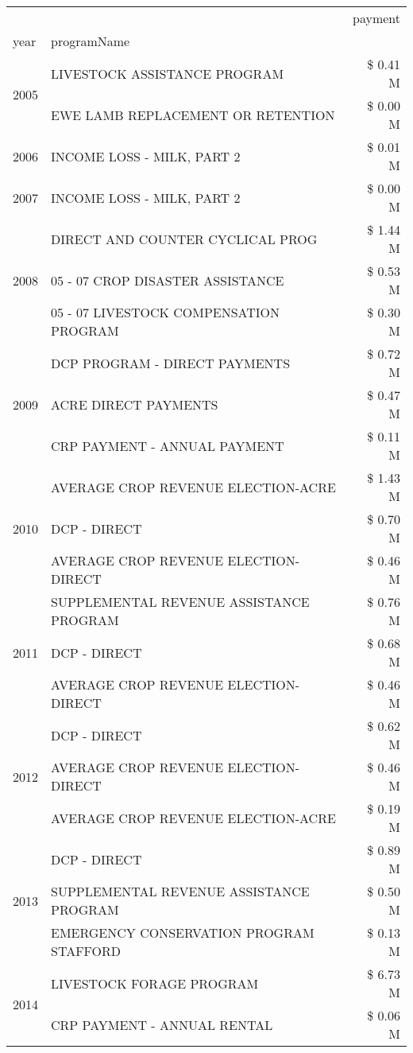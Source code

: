 \begin{tabular}{llr}
\toprule
 &  & payment \\
year & programName &  \\
\midrule
\multirow[t]{2}{*}{2005} & LIVESTOCK ASSISTANCE PROGRAM & \$ 0.41 M \\
 & EWE LAMB REPLACEMENT OR RETENTION & \$ 0.00 M \\
\cline{1-3}
2006 & INCOME LOSS - MILK, PART 2 & \$ 0.01 M \\
\cline{1-3}
2007 & INCOME LOSS - MILK, PART 2 & \$ 0.00 M \\
\cline{1-3}
\multirow[t]{3}{*}{2008} & DIRECT AND COUNTER CYCLICAL PROG & \$ 1.44 M \\
 & 05 - 07 CROP DISASTER ASSISTANCE & \$ 0.53 M \\
 & 05 - 07 LIVESTOCK COMPENSATION PROGRAM & \$ 0.30 M \\
\cline{1-3}
\multirow[t]{3}{*}{2009} & DCP PROGRAM - DIRECT PAYMENTS & \$ 0.72 M \\
 & ACRE DIRECT PAYMENTS & \$ 0.47 M \\
 & CRP PAYMENT - ANNUAL PAYMENT & \$ 0.11 M \\
\cline{1-3}
\multirow[t]{3}{*}{2010} & AVERAGE CROP REVENUE ELECTION-ACRE & \$ 1.43 M \\
 & DCP - DIRECT & \$ 0.70 M \\
 & AVERAGE CROP REVENUE ELECTION-DIRECT & \$ 0.46 M \\
\cline{1-3}
\multirow[t]{3}{*}{2011} & SUPPLEMENTAL REVENUE ASSISTANCE PROGRAM & \$ 0.76 M \\
 & DCP - DIRECT & \$ 0.68 M \\
 & AVERAGE CROP REVENUE ELECTION-DIRECT & \$ 0.46 M \\
\cline{1-3}
\multirow[t]{3}{*}{2012} & DCP - DIRECT & \$ 0.62 M \\
 & AVERAGE CROP REVENUE ELECTION-DIRECT & \$ 0.46 M \\
 & AVERAGE CROP REVENUE ELECTION-ACRE & \$ 0.19 M \\
\cline{1-3}
\multirow[t]{3}{*}{2013} & DCP - DIRECT & \$ 0.89 M \\
 & SUPPLEMENTAL REVENUE ASSISTANCE PROGRAM & \$ 0.50 M \\
 & EMERGENCY CONSERVATION PROGRAM STAFFORD & \$ 0.13 M \\
\cline{1-3}
\multirow[t]{3}{*}{2014} & LIVESTOCK FORAGE PROGRAM & \$ 6.73 M \\
 & CRP PAYMENT - ANNUAL RENTAL & \$ 0.06 M \\

\end{tabular}
